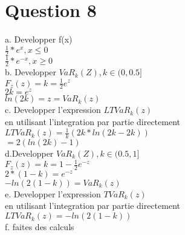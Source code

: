 \section{Question 8}

a. Developper f(x)\\
$\frac{1}{2}*e^{x}, x \le 0$\\
$\frac{1}{2}*e^{-x}, x \geq 0$\\

b. Developper $VaR_k(Z), k \in (0, 0.5]$\\
$F_z(z) = k = \frac{1}{2}e^z$\\
$2k = e^z$\\
$ln(2k) = z = VaR_k(z)$\\

c. Developper l'expression $LTVaR_k(z)$\\
en utilisant l'integration par partie directement\\
$LTVaR_k(z) = \frac{1}{k}(2k*ln(2k-2k))$\\
$ = 2(ln(2k)-1)$\\

d.Developper $VaR_k(Z), k \in (0.5, 1]$\\
 $F_z(z) = k = 1-\frac{1}{2}e^{-z}$\\
 $2*(1-k) = e^{-z}$\\
 $-ln(2(1-k)) =  VaR_k(z)$\\
 
e. Developper l'expression $TVaR_k(z)$\\
en utilisant l'integration par partie directement\\
$LTVaR_k(z) = -ln(2(1-k))$\\
 
f. faites des calculs